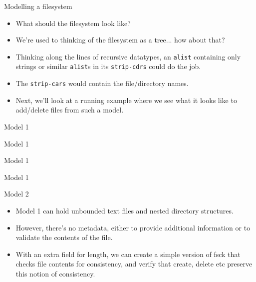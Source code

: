 \documentclass{beamer}
\begin{document}
\begin{frame}{Modelling a filesystem}
  \begin{itemize}
  \item What should the filesystem look like?
  \item We're used to thinking of the filesystem as a tree... how
    about that?
  \item Thinking along the lines of recursive datatypes, an \texttt{alist}
    containing only strings or similar \texttt{alist}s in its
    \texttt{strip-cdrs} could do the job.
  \item The \texttt{strip-cars} would contain the file/directory
    names.
  \item Next, we'll look at a running example where we see what it
    looks like to add/delete files from such a model.
  \end{itemize}
\end{frame}

\begin{frame}{Model 1}
  \begin{figure}
    \centering
    \def\svgwidth{\columnwidth}
    
  \end{figure}
\end{frame}

\begin{frame}{Model 1}
  \begin{figure}
    \centering
    \def\svgwidth{\columnwidth}
    
  \end{figure}
\end{frame}

\begin{frame}{Model 1}
  \begin{figure}
    \centering
    \def\svgwidth{\columnwidth}
    
  \end{figure}
\end{frame}

\begin{frame}{Model 1}
  \begin{figure}
    \centering
    \def\svgwidth{\columnwidth}
    
  \end{figure}
\end{frame}

\begin{frame}{Model 2}
  \begin{itemize}
  \item Model 1 can hold unbounded text files and nested directory
    structures.
  \item However, there's no metadata, either to provide additional
    information or to validate the contents of the file.
  \item With an extra field for length, we can create a simple
    version of fsck that checks file contents for consistency, and
    verify that create, delete etc preserve this notion of
    consistency.
  \end{itemize}
\end{frame}
\end{document}

